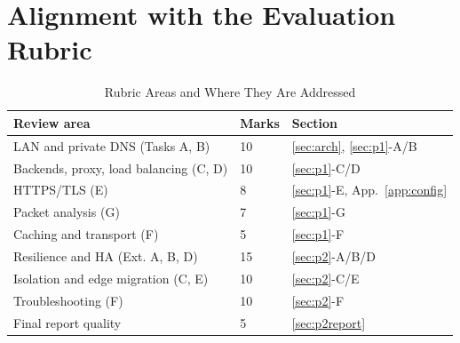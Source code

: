 \documentclass[conference,a4paper]{IEEEtran}
\begin{document}
\section{Alignment with the Evaluation Rubric}
\begin{table}[H]
\caption{Rubric Areas and Where They Are Addressed}
\label{tab:rubric}
\centering\footnotesize
\begin{tabularx}{\columnwidth}{@{}LP{0.7cm}P{1.9cm}@{}}
\toprule
\textbf{Review area} & \textbf{Marks} & \textbf{Section}\\
\midrule
LAN and private DNS (Tasks A, B) & 10 & \ref{sec:arch}, \ref{sec:p1}-A/B\\
Backends, proxy, load balancing (C, D) & 10 & \ref{sec:p1}-C/D\\
HTTPS/TLS (E) & 8 & \ref{sec:p1}-E, App.~\ref{app:config}\\
Packet analysis (G) & 7 & \ref{sec:p1}-G\\
Caching and transport (F) & 5 & \ref{sec:p1}-F\\
Resilience and HA (Ext. A, B, D) & 15 & \ref{sec:p2}-A/B/D\\
Isolation and edge migration (C, E) & 10 & \ref{sec:p2}-C/E\\
Troubleshooting (F) & 10 & \ref{sec:p2}-F\\
Final report quality & 5 & \ref{sec:p2report}\\
\bottomrule
\end{tabularx}
\end{table}
\end{document}
